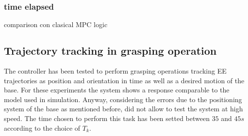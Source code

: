		\subsubsection{time elapsed}
			comparison con clasical MPC logic

	\subsection{Trajectory tracking in grasping operation}

	The controller has been tested to perform grasping operations tracking EE trajectories as position and orientation in time as well as a desired motion of the base. For these experiments the system shows a response comparable to the model used in simulation. Anyway, considering the errors due to the positioning system of the base as mentioned before, did not allow to test the system at high speed. The time chosen to perform this task has been setted between $35$ and $45 s$ according to the choice of $T_k$. 


